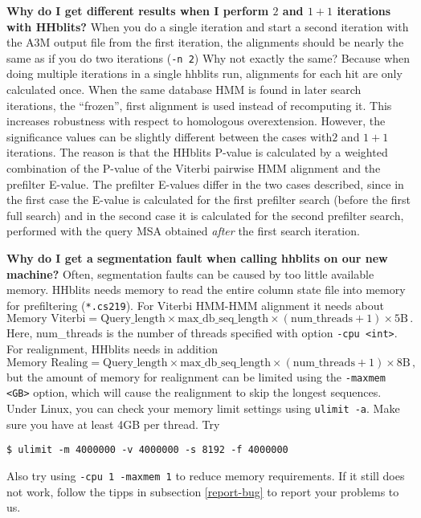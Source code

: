\documentclass[11pt,a4paper]{article}
\begin{document}
{\label{2_vs_1+1} \bf Why do I get different results when I perform $2$ and $1+1$ iterations with HHblits?} When you do a single iteration and start a second iteration with the A3M output file from the first iteration, the alignments should be nearly the same as if you do two iterations (\verb`-n 2`) Why not exactly the same? Because when doing multiple iterations in a single hhblits run, alignments for each hit are only calculated once. When the same database HMM is found in later search iterations, the ``frozen'', first alignment is used instead of recomputing it. This increases robustness with respect to homologous overextension. However, the significance values can be slightly different between the cases with$2$ and $1+1$ iterations. The reason is that the HHblits P-value is calculated by a weighted combination of the P-value of the Viterbi pairwise HMM alignment and the prefilter E-value. The prefilter E-values differ in the two cases described, since in the first case the E-value is calculated for the first prefilter search (before the first full search) and in the second case it is calculated for the second prefilter search, performed with the query MSA obtained \emph{after} the first search iteration. 

{\bf Why do I get a segmentation fault when calling hhblits on our new machine?}
Often, segmentation faults can be caused by too little available memory. HHblits needs memory to read the entire column state file into memory for prefiltering (\verb`*.cs219`). For Viterbi HMM-HMM alignment it needs about 
\begin{equation}
\textrm{Memory Viterbi} = \textrm{Query\_length} \times \textrm{max\_db\_seq\_length} \times (\textrm{num\_threads}+1) \times 5 \textrm{B} \,. 
\end{equation}
Here, num\_threads is the number of threads specified with option \verb`-cpu <int>`. For realignment, HHblits needs in addition 
\begin{equation}
\textrm{Memory Realing} = \textrm{Query\_length} \times \textrm{max\_db\_seq\_length} \times (\textrm{num\_threads}+1) \times 8 \textrm{B} \,, 
\end{equation}
but the amount of memory for realignment can be limited using the \verb`-maxmem <GB>` option, which will cause the realignment to skip the longest sequences. Under Linux, you can check your memory limit settings using \verb`ulimit -a`. Make sure you have at least 4GB per thread. Try 
\begin{verbatim}
$ ulimit -m 4000000 -v 4000000 -s 8192 -f 4000000
\end{verbatim}
Also try using \verb`-cpu 1 -maxmem 1` to reduce memory requirements. If it still does not work, follow the tipps in subsection \ref{report-bug} to report your problems to us.
\end{document}
